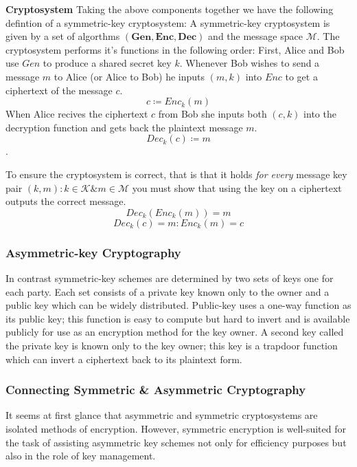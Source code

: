 \textbf{Cryptosystem}
\medskip
Taking the above components together we have the following defintion of a symmetric-key cryptosystem:
\newline
A symmetric-key cryptosystem is given by a set of algorthms $\mathbf{(Gen, Enc, Dec)}$ and the message space $\mathcal{M}$.
\newline
The cryptosystem performs it's functions in the following order:
\newline
First, Alice and Bob use $Gen$ to produce a shared secret key $k$.
\newline
Whenever Bob wishes to send a message $m$ to Alice (or Alice to Bob) he inputs $(m,k)$ into $Enc$ to get a ciphertext of the message $c$.
$$c \coloneqq Enc_{k}(m)$$
\newline
When Alice recives the ciphertext $c$ from Bob she inputs both $(c,k)$ into the decryption function and gets back the plaintext message $m$.
$$Dec_{k}(c) \coloneqq m$$.
\medskip

To ensure the cryptosystem is correct, that is that it holds \textit{for every} message key pair $(k,m) : k \in \mathcal{K} \& m \in \mathcal{M}$ you must show that using the key on a ciphertext outputs the correct message. 
$$Dec_{k}(Enc_{k}(m)) = m$$
\newline
$$Dec_{k}(c) = m : Enc_{k}(m) = c$$



\subsubsection{Asymmetric-key Cryptography}
In contrast symmetric-key schemes are determined by two sets of keys one for each party. Each set consists of a private key known only to the owner and a {public key} which can be widely distributed.
Public-key uses a {one-way function} as its public key; this function is easy to compute but hard to invert and is available publicly for use as an encryption method for the key owner. A second key called the private key is known only to the key owner; this key is a {trapdoor function} which can invert a ciphertext back to its plaintext form.


 
\subsubsection{Connecting Symmetric \& Asymmetric Cryptography}
It seems at first glance that asymmetric and symmetric cryptosystems are isolated methods of encryption. However, symmetric encryption is well-suited for the task of assisting asymmetric key schemes not only for efficiency purposes but also in the role of key management. 
